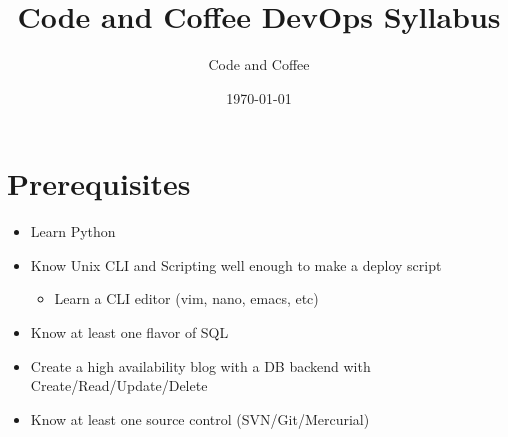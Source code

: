 \documentclass[12pt]{article}
\title{Code and Coffee DevOps Syllabus}
\author{Code and Coffee}
\date{\today}
\begin{document}
\maketitle

\section{Prerequisites}
\begin{itemize}
\item Learn Python
\item Know Unix CLI and Scripting well enough to make a deploy script
  \begin{itemize}
  \item Learn a CLI editor (vim, nano, emacs, etc)
  \end{itemize}
\item Know at least one flavor of SQL
\item Create a high availability blog with a DB backend with
  Create/Read/Update/Delete
\item Know at least one source control (SVN/Git/Mercurial)
\end{itemize}
\end{document}
